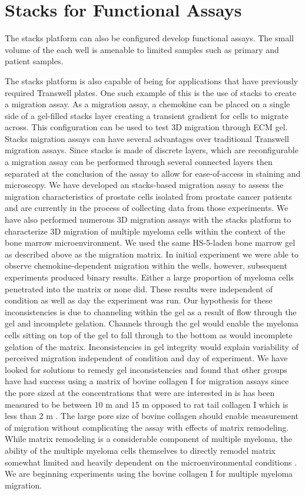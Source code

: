 \section{Stacks for Functional Assays}
The stacks platform can also be configured develop functional assays. The small volume of the each well is amenable to limited samples such as primary and patient samples.

The stacks platform is also capable of being for applications that have previously required Transwell plates. One such example of this is the use of stacks to create a migration assay. As a migration assay, a chemokine can be placed on a single side of a gel-filled stacks layer creating a transient gradient for cells to migrate across. This configuration can be used to test  3D migration through ECM gel. Stacks migration assays can have several advantages over traditional Transwell migration assays. Since stacks is made of discrete layers, which are reconfigurable a migration assay can be performed through several connected layers then separated at the conclusion of the assay to allow for ease-of-access in staining and microscopy. We have developed an stacks-based migration assay to assess the migration characteristics of prostate cells isolated from prostate cancer patients and are currently in the process of collecting data from those experiments. We have also performed numerous 3D migration assays with the stacks platform to characterize 3D migration of multiple myeloma cells within the context of the bone marrow microenvironment. We used the same HS-5-laden bone marrow gel as described above as the migration matrix. In initial experiment we were able to observe chemokine-dependent migration within the wells, however, subsequent experiments produced binary results. Either a large proportion of myeloma cells penetrated into the matrix or none did. These results were independent of condition as well as day the experiment was run. Our hypothesis for these inconsistencies is due to channeling within the gel as a result of flow through the gel and incomplete gelation. Channels through the gel would enable the myeloma cells sitting on top of the gel to fall through to the bottom as would incomplete gelation of the matrix. Inconsistencies in gel integrity would explain variability of perceived migration independent of condition and day of experiment. We have looked for solutions to remedy gel inconsistencies and found that other groups have had success using a matrix of bovine collagen I for migration assays since the pore sized at the concentrations that were are interested in is has been measured to be between 10 \textmu m and 15 \textmu m opposed to rat tail collagen I  which is less than 2 \textmu m \cite{Wolf2009, Wolf2013}. The large pore size of bovine collagen should enable measurement of migration without complicating the assay with effects of matrix remodeling. While matrix remodeling is a considerable component of multiple myeloma, the ability of the multiple myeloma cells themselves to directly remodel matrix somewhat limited and heavily dependent on the microenvironmental conditions \cite{Barille1997,Slany2014}. We are beginning experiments using the bovine collagen I for multiple myeloma migration.




